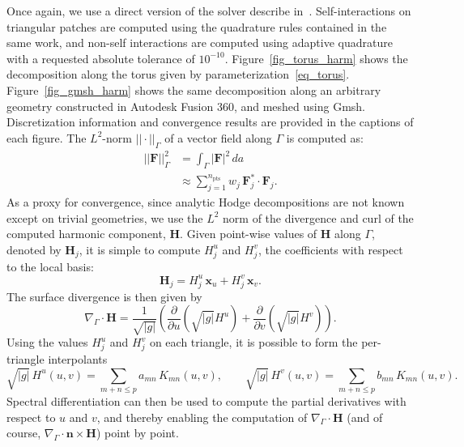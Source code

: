 \documentclass[11pt]{article}
\newcommand{\surfdiv}{\nabla_\Gamma \cdot}
\newcommand{\bn}{\bm n}
\newcommand{\bx}{\bm x}
\newcommand{\bF}{\bm F}
\newcommand{\bH}{\bm H}
\newcommand{\npts}{n_{\text{pts}}}
\numberwithin{equation}{section}
\begin{document}
Once again, we use a direct version of the solver 
describe in~\cite{bremer_2012c}. Self-interactions on triangular
patches are computed using the quadrature rules contained in the same
work, 
and non-self interactions are computed using adaptive quadrature with
a requested absolute tolerance of
$10^{-10}$. Figure~\ref{fig_torus_harm} shows the decomposition along
the torus given by
parameterization~\eqref{eq_torus}. Figure~\ref{fig_gmsh_harm} shows
the same decomposition along an arbitrary geometry constructed in
Autodesk Fusion 360, and meshed using Gmsh. Discretization information
and convergence results are
provided in the captions of each figure.
The $L^2$-norm $||\cdot ||_\Gamma$
of a vector field along $\Gamma$ is computed as:
\begin{equation}
  \begin{aligned}
    ||\bF||^2_\Gamma &=  \int_\Gamma |\bF|^2 \,  da   \\
    &\approx \sum_{j=1}^{\npts} w_j \, \bF^*_j \cdot \bF_j.
\end{aligned}
\end{equation}
As a proxy for convergence, since analytic Hodge
decompositions are not known except on trivial geometries,
we use the $L^2$ norm of the divergence and
curl of the computed harmonic component, $\bH$. Given point-wise values
of $\bH$ along $\Gamma$, denoted by $\bH_j$, it is simple to compute
$H^u_j$ and $H^v_j$, the coefficients with respect to the local basis:
\begin{equation}
  \bH_j = H^u_j \, \bx_u + H^v_j \, \bx_v.
\end{equation}
The surface divergence is then given by
\begin{equation}
  \surfdiv \bH = \frac{1}{\sqrt{|g|}} \left(
    \frac{\partial}{\partial u} \left( \sqrt{|g|} H^u \right)  +
    \frac{\partial}{\partial v}
    \left( \sqrt{|g|} H^v \right) \right) .
\end{equation}
Using the values $H^u_j$ and $H^v_j$ on each triangle,
it is possible to form the per-triangle interpolants
\begin{equation}
  \sqrt{|g|} \, H^u(u,v) = \sum_{m+n\leq p} a_{mn} \, K_{mn}(u,v), \qquad
  \sqrt{|g|} \, H^v(u,v) = \sum_{m+n\leq p} b_{mn} \, K_{mn}(u,v).
\end{equation}
Spectral differentiation can then be used to compute the partial
derivatives with respect to $u$ and $v$, and thereby enabling the
computation of $\surfdiv \bH$ (and of course, $\surfdiv \bn \times
\bH$) point by point.
\end{document}
